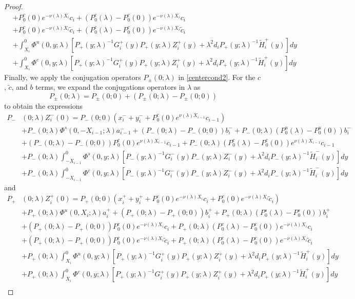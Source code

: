 \documentclass[thesis.tex]{subfiles}
\begin{document}
\begin{lemma}
\begin{proof}
\begin{align*}
&+ P_0^c(0) e^{-\nu(\lambda)X_i} c_i + (P_0^c(\lambda) - P_0^c(0)) e^{-\nu(\lambda)X_i} c_i \\
&+ P_0^c(0) e^{-\nu(\lambda)X_i} \tilde{c}_i + (P_0^c(\lambda) - P_0^c(0)) e^{-\nu(\lambda)X_i} \tilde{c}_i \\
&+ \int_{X_i}^0 \Phi^u(0, y; \lambda) [P_+(y; \lambda)^{-1} G_i^+(y) P_+(y; \lambda) Z_i^+(y) + \lambda^2 d_i P_+(y; \lambda)^{-1} \tilde{H}_i^+(y)] dy \\
&+ \int_{X_i}^0 \Phi^c(0, y; \lambda) [P_+(y; \lambda)^{-1} G_i^+(y) P_+(y; \lambda) Z_i^+(y) + \lambda^2 d_i P_+(y; \lambda)^{-1} \tilde{H}_i^+(y)] dy 
\end{align*}
Finally, we apply the conjugation operators $P_\pm(0; \lambda)$ in \eqref{centercond2}. For the $c$, $\tilde{c}$, and $b$ terms, we expand the conjugations operators in $\lambda$ as
\[
P_\pm(0; \lambda) = P_\pm(0; 0) + (P_\pm(0; \lambda) - P_\pm(0; 0))
\]
to obtain the expressions
\begin{align*}
P_-&(0; \lambda) Z_i^-(0) = P_-(0; 0)( x_i^- + y_i^- + P_0^c(0) e^{\nu(\lambda) X_{i-1}} c_{i-1} ) \\
&+ P_-(0; \lambda) \Phi^s(0, -X_{i-1}; \lambda) a_{i-1}^- + (P_-(0; \lambda) - P_-(0; 0))b_i^- + P_-(0; \lambda)(P_0^u(\lambda) - P_0^u(0))b_i^- \\
&+ (P_-(0; \lambda) - P_-(0; 0)) P_0^c(0) e^{\nu(\lambda) X_{i-1}} c_{i-1} + P_-(0; \lambda) (P_0^c(\lambda) - P_0^c(0)) e^{\nu(\lambda) X_{i-1}} c_{i-1} \\
&+ P_-(0; \lambda) \int_{-X_{i-1}}^0 \Phi^s(0, y; \lambda) [P_-(y; \lambda)^{-1} G_i^-(y) P_-(y; \lambda)Z_i^-(y) + \lambda^2 d_i P_-(y; \lambda)^{-1} \tilde{H}_i^-(y)] dy \\
&+ P_-(0; \lambda) \int_{-X_{i-1}}^0 \Phi^c(0, y; \lambda) [P_-(y; \lambda)^{-1} G_i^-(y) P_-(y; \lambda)Z_i^-(y) + \lambda^2 d_i P_-(y; \lambda)^{-1} \tilde{H}_i^-(y)] dy 
\end{align*}
and
\begin{align*}
P_+&(0; \lambda) Z_i^+(0) = P_+(0; 0)( x_i^+ + y_i^+ + P_0^c(0) e^{-\nu(\lambda)X_i} c_i + P_0^c(0) e^{-\nu(\lambda)X_i} \tilde{c}_i )\\
&+ P_+(0; \lambda) \Phi^u(0, X_i; \lambda) a_i^+ + (P_+(0; \lambda) - P_+(0; 0)) b_i^+ + P_+(0; \lambda) (P_0^s(\lambda) - P_0^s(0)) b_i^+ \\
&+ (P_+(0; \lambda) - P_+(0; 0))P_0^c(0) e^{-\nu(\lambda)X_i} c_i + P_+(0; \lambda) (P_0^c(\lambda) - P_0^c(0)) e^{-\nu(\lambda)X_i} c_i \\
&+ (P_+(0; \lambda) - P_+(0; 0))P_0^c(0) e^{-\nu(\lambda)X_i} \tilde{c}_i + P_+(0; \lambda) (P_0^c(\lambda) - P_0^c(0)) e^{-\nu(\lambda)X_i} \tilde{c}_i \\
&+ P_+(0; \lambda) \int_{X_i}^0 \Phi^u(0, y; \lambda) [P_+(y; \lambda)^{-1} G_i^+(y) P_+(y; \lambda) Z_i^+(y) + \lambda^2 d_i P_+(y; \lambda)^{-1} \tilde{H}_i^+(y)] dy \\
&+ P_+(0; \lambda) \int_{X_i}^0 \Phi^c(0, y; \lambda) [P_+(y; \lambda)^{-1} G_i^+(y) P_+(y; \lambda) Z_i^+(y) + \lambda^2 d_i P_+(y; \lambda)^{-1} \tilde{H}_i^+(y)] dy \\
\end{align*}


\end{proof}
\end{lemma}
\end{document}
